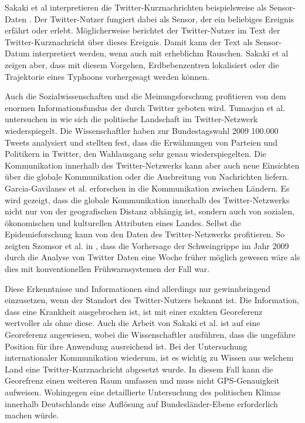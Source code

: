 		Sakaki et al interpretieren die Twitter-Kurznachrichten beispielsweise als Sensor-Daten \cite{Sakaki2010}.
		Der Twitter-Nutzer fungiert dabei als Sensor, der ein beliebiges Ereignis erfährt oder erlebt.
		Möglicherweise berichtet der Twitter-Nutzer im Text der Twitter-Kurznachricht über dieses Ereignis. 
		Damit kann der Text als Sensor-Datum interpretiert werden, wenn auch mit erheblichm Rauschen.    
		Sakaki et al zeigen aber, dass mit diesem Vorgehen, Erdbebenzentren lokalisiert oder die Trajektorie eines Typhoons vorhergesagt werden können.  
		
		Auch die Sozialwissenschaften und die Meinungsforschung profitieren von dem enormen Informationsfundus der durch Twitter geboten wird.  
		Tumasjan et al. untersuchen in \cite{Tumasjan2011} wie sich die politische Landschaft im Twitter-Netzwerk wiederspiegelt. 
		Die Wissenschaftler haben zur Bundestagswahl 2009 100.000 Tweets analysiert und stellten fest, dass die Erwähnungen von Parteien und Politikern in Twitter, den Wahlausgang sehr genau wiederspiegelten.  
		Die Kommunikation innerhalb des Twitter-Netzwerks kann aber auch neue Einsichten über die globale Kommunikation oder die Ausbreitung von Nachrichten liefern.
		Garcia-Gavilanes et al. erforschen in \cite{Garcia-Gavilanes2014} die Kommunikation zwischen Ländern. 
		Es wird gezeigt, dass die globale Kommunikation innerhalb des Twitter-Netzwerks nicht nur von der geografischen Distanz abhängig ist, sondern auch von sozialen, ökonomischen und kulturellen Attributen eines Landes.   
		Selbst die Epidemieforschung kann von den Daten des Twitter-Netzwerks profitieren. 
		So zeigten Szomsor et al. in \cite{Szomszor2011}, dass die Vorhersage der Schweingrippe im Jahr 2009 durch die Analyse von Twitter Daten eine Woche früher möglich gewesen wäre als dies mit konventionellen Frühwarnsystemen der Fall war. 

		Diese Erkenntnisse und Informationen sind allerdings nur gewinnbringend einzusetzen, wenn der Standort des Twitter-Nutzers bekannt ist. 
		Die Information, dass eine Krankheit ausgebrochen ist, ist mit einer exakten Georeferenz wertvoller als ohne diese. 
		Auch die Arbeit von Sakaki et al. ist auf eine Georeferenz angewiesen, wobei die Wissenschaftler ausführen, dass die ungefähre Position für ihre Anwendung ausreichend ist.
		Bei der Untersuchung internationaler Kommunikation wiederum, ist es wichtig zu Wissen aus welchem Land eine Twitter-Kurznachricht abgesetzt wurde.
		In diesem Fall kann die Georefrenz einen weiteren Raum umfassen und muss nicht GPS-Genauigkeit aufweisen.  
		Wohingegen eine detaillierte Untersuchung des politischen Klimas innerhalb Deutschlands eine Auflösung auf Bundesländer-Ebene erforderlich machen würde. 

